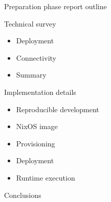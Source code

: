 \begin{frame}{Preparation phase report outline}
\begin{block}{Technical survey}
\protect\hypertarget{technical-survey}{}
\begin{itemize}
\tightlist
\item
  Deployment
\item
  Connectivity
\item
  Summary
\end{itemize}
\end{block}

\begin{block}{Implementation details}
\protect\hypertarget{implementation-details}{}
\begin{itemize}
\tightlist
\item
  Reproducible development
\item
  NixOS image
\item
  Provisioning
\item
  Deployment
\item
  Runtime execution
\end{itemize}
\end{block}

\begin{block}{Conclusions}
\protect\hypertarget{conclusions}{}
\end{block}
\end{frame}

